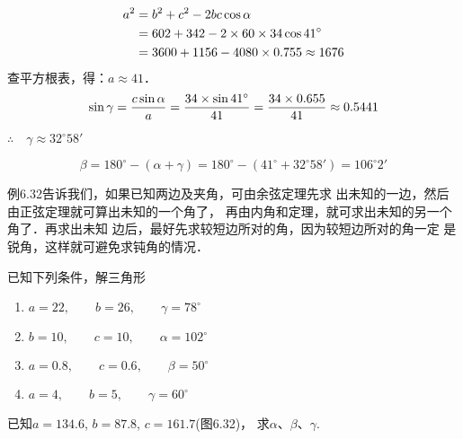 \begin{solution}
\[\begin{split}
    a^2&=b^2+c^2-2bc\cos\alpha\\
&=602+342-2\times60\times34\cos41^{\circ}\\
&=3600+1156-4080\times0.755\approx 1676
\end{split}\]
查平方根表，得：$a\approx 41$．
\[\sin\gamma=\dfrac{c\sin\alpha}{a}=\dfrac{34\times\sin41^{\circ}}{41}=\dfrac{34\times 0.655}{41}\approx 0.5441\]

$\therefore\quad \gamma\approx 32^{\circ}58'$

\[\beta=180^{\circ}-(\alpha+\gamma)
=180^{\circ}-(41^{\circ}+32^{\circ}58')
=106^{\circ}2'\]    
\end{solution}


例6.32告诉我们，如果已知两边及夹角，可由余弦定理先求
出未知的一边，然后由正弦定理就可算出未知的一个角了，
再由内角和定理，就可求出未知的另一个角了．再求出未知
边后，最好先求较短边所对的角，因为较短边所对的角一定
是锐角，这样就可避免求钝角的情况．

\begin{ex}
    已知下列条件，解三角形
\begin{enumerate}
\item  $a=22,\qquad b=26,\qquad \gamma=78^{\circ}$
\item  $b=10,\qquad c=10,\qquad \alpha=102^{\circ}$
\item  $a=0.8,\qquad c=0.6,\qquad \beta=50^{\circ}$
\item  $a=4,\qquad b=5,\qquad \gamma=60^{\circ}$
\end{enumerate}
\end{ex}

\begin{example}
    已知$a=134.6$, $b=87.8$, $c=161.7$(图6.32)，
    求$\alpha$、$\beta$、$\gamma$.
\end{example}

\begin{figure}[htp]
    \centering
{}
    \caption{}
\end{figure}

